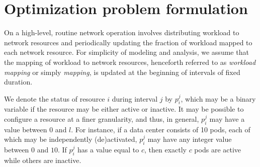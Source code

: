 
\section{Optimization problem formulation}
\label{sec:framework:optimization}
On a high-level, routine network operation involves distributing workload to network resources and periodically updating the fraction of workload mapped to each network resource. For simplicity of modeling and analysis, we assume that the mapping of workload to network resources, henceforth referred to as \textit{workload mapping} or simply \textit{mapping}, is updated at the beginning of intervals of fixed duration. 

We denote the status of resource $i$ during interval $j$ by $p_i^j$, which may be a binary variable if the resource may be either active or inactive. It may be possible to configure a resource at a finer granularity, and thus, in general, $p_i^j$ may have a value between $0$ and $l$. For instance, if a data center consists of 10 pods, each of which may be independently (de)activated, $p_i^j$ may have any integer value between $0$ and $10$. If $p_i^j$ has a value equal  to $c$, then exactly $c$ pods are active while others are inactive. 

